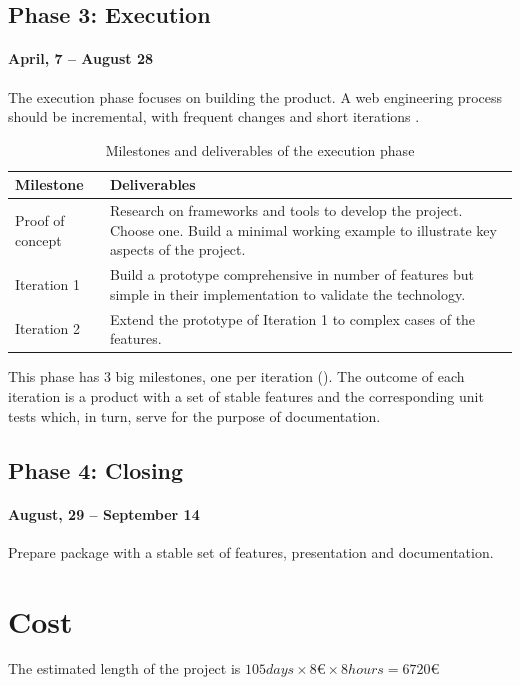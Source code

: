 \subsection{Phase 3: Execution}
\paragraph{April, 7 -- August 28}
The execution phase focuses on building the product. 
A web engineering process should be incremental, with frequent changes and short iterations \cite{Kappel:2006}.

\begin{table}[ht]
    \label{tab:milestones}
    \centering
    \begin{tabularx}{\linewidth}{| X | X |}
    \hline
    Milestone & Deliverables \\
    \hline
    Proof of concept & Research on frameworks and tools to develop the project. Choose one. Build a minimal working example to illustrate key aspects of the project. \\ \hline
    Iteration 1 & Build a prototype comprehensive in number of features but simple in their implementation to validate the technology. \\ \hline
    Iteration 2 & Extend the prototype of Iteration 1 to complex cases of the features. \\
    \hline
    \end{tabularx}
    \caption{Milestones and deliverables of the execution phase}
\end{table}

This phase has 3 big milestones, one per iteration (). 
The outcome of each iteration is a product with a set of stable features and the corresponding unit tests which, in turn, serve for the purpose of documentation.

\subsection{Phase 4: Closing}
\paragraph{August, 29 -- September 14}
Prepare package with a stable set of features, presentation and documentation.

\section{Cost}
\label{sec:budget}
The estimated length of the project is $105 days \times 8 \euro{} \times 8 hours = 6720 \euro{} $

